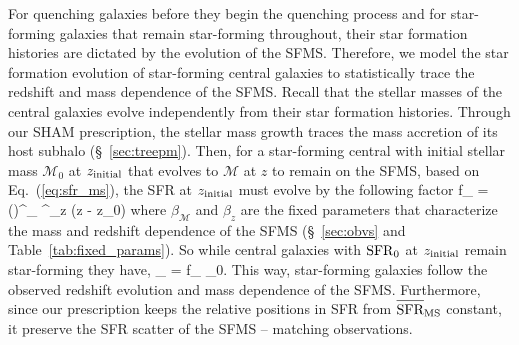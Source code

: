 For quenching galaxies before they begin the quenching process and for 
star-forming galaxies that remain star-forming throughout, 
their star formation histories are dictated by the evolution 
of the SFMS. Therefore, we model the star formation evolution of star-forming 
central galaxies to statistically trace the redshift and mass 
dependence of the SFMS. Recall that the stellar masses of the central galaxies
evolve independently from their star formation histories.
Through our SHAM prescription, the stellar mass growth traces 
the mass accretion of its host subhalo (\S~\ref{sec:treepm}).
Then, for a star-forming central with initial stellar mass 
$\mathcal{M}_0$ at $z_\mathrm{initial}$ that evolves to $\mathcal{M}$ 
at $z$ to remain on the SFMS, based on Eq.~(\ref{eq:sfr_ms}), 
the SFR at $z_\mathrm{initial}$ must evolve by the following factor  
\beq \label{eq:delta_sfr_ms}
f_ = \left(\right)^{\beta_} ^{\beta_z (z - z_0)}
\eeq
where $\beta_\mathcal{M}$ and $\beta_z$ are the fixed parameters 
that characterize the mass and redshift dependence of the SFMS 
(\S~\ref{sec:obvs} and Table~\ref{tab:fixed_params}). So
while central galaxies with $\mathrm{SFR}_0$ at $z_\mathrm{initial}$ remain 
star-forming they have, 
\beq
\SFR_ = f_ \times \SFR_0.
\eeq
This way, star-forming galaxies follow the observed redshift 
evolution and mass dependence of the SFMS. Furthermore, since 
our prescription keeps the relative positions in SFR from 
$\avgSFR_\mathrm{MS}$ constant, it preserve the SFR scatter 
of the SFMS -- matching observations. 

